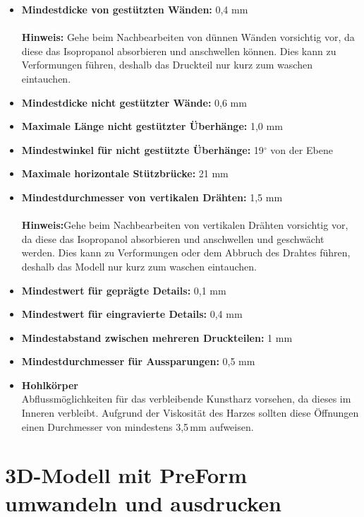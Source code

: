 \documentclass{\basedir/fablab-document}
\begin{document}
\begin{itemize}
    \item \textbf{Mindestdicke von gestützten Wänden:}  0,4 mm\\
        \\
        \textbf{Hinweis:} Gehe beim Nachbearbeiten von dünnen Wänden vorsichtig vor, da diese das Isopropanol absorbieren und anschwellen können. Dies kann zu Verformungen führen, deshalb das Druckteil nur kurz zum waschen eintauchen. \\
    \item \textbf{Mindestdicke nicht gestützter Wände:}  0,6 mm
    \item \textbf{Maximale Länge nicht gestützter Überhänge:}  1,0 mm
    \item \textbf{Mindestwinkel für nicht gestützte Überhänge:}  19$^\circ$ von der Ebene
    \item \textbf{Maximale horizontale Stützbrücke:}  21 mm
    \item \textbf{Mindestdurchmesser von vertikalen Drähten:}  1,5 mm \\
        \\
        \textbf{Hinweis:}Gehe beim Nachbearbeiten von vertikalen Drähten vorsichtig vor, da diese das Isopropanol absorbieren und anschwellen und geschwächt werden. Dies kann zu Verformungen oder dem Abbruch des Drahtes führen, deshalb das Modell nur kurz zum waschen eintauchen. \\
    \item \textbf{Mindestwert für geprägte Details:}  0,1 mm
    \item \textbf{Mindestwert für eingravierte Details:}  0,4 mm
    \item \textbf{Mindestabstand zwischen mehreren Druckteilen:}  1 mm
    \item \textbf{Mindestdurchmesser für Aussparungen:}  0,5 mm
    \item \textbf{Hohlkörper} \\
        Abflussmöglichkeiten für das verbleibende Kunstharz vorsehen, da dieses im Inneren verbleibt. Aufgrund der Viskosität des Harzes sollten diese Öffnungen einen Durchmesser von mindestens 3,5\,mm aufweisen.

\end{itemize}


\newpage



\section{3D-Modell mit PreForm umwandeln und ausdrucken}
\end{document}
